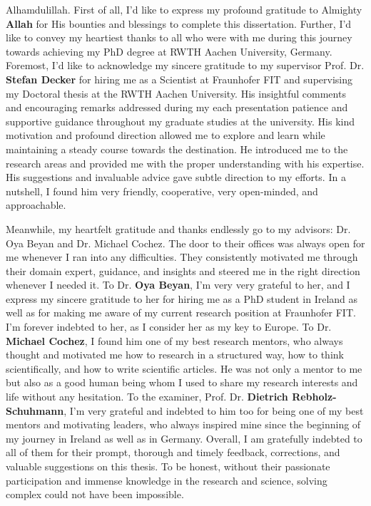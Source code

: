

\begin{acknowledgements}
    Alhamdulillah. First of all, I'd like to express my profound gratitude to Almighty \textbf{Allah} for His bounties and blessings to complete this dissertation. Further, I'd like to convey my heartiest thanks to all who were with me during this journey towards achieving my PhD degree at RWTH Aachen University, Germany. Foremost, I'd like to acknowledge my sincere gratitude to my supervisor Prof. Dr. \textbf{Stefan Decker} for hiring me as a Scientist at Fraunhofer FIT and supervising my Doctoral thesis at the RWTH Aachen University. His insightful comments and encouraging remarks addressed during my each presentation patience and supportive guidance throughout my graduate studies at the university. His kind motivation and profound direction allowed me to explore and learn while maintaining a steady course towards the destination. He introduced me to the research areas and provided me with the proper understanding with his expertise. His suggestions and invaluable advice gave subtle direction to my efforts. In a nutshell, I found him very friendly, cooperative, very open-minded, and approachable. 
    
    \hspace*{5mm} Meanwhile, my heartfelt gratitude and thanks endlessly go to my advisors: Dr. Oya Beyan and Dr. Michael Cochez. The door to their offices was always open for me whenever I ran into any difficulties. They consistently motivated me through their domain expert, guidance, and insights and steered me in the right direction whenever I needed it. To Dr. \textbf{Oya Beyan}, I'm very very grateful to her, and I express my sincere gratitude to her for hiring me as a PhD student in Ireland as well as for making me aware of my current research position at Fraunhofer FIT. I'm forever indebted to her, as I consider her as my key to Europe. To Dr. \textbf{Michael Cochez}, I found him one of my best research mentors, who always thought and motivated me how to research in a structured way, how to think scientifically, and how to write scientific articles. He was not only a mentor to me but also as a good human being whom I used to share my research interests and life without any hesitation. To the examiner, Prof. Dr. \textbf{Dietrich Rebholz-Schuhmann}, I'm very grateful and indebted to him too for being one of my best mentors and motivating leaders, who always inspired mine since the beginning of my journey in Ireland as well as in Germany. Overall, I am gratefully indebted to all of them for their prompt, thorough and timely feedback, corrections, and valuable suggestions on this thesis. To be honest, without their passionate participation and immense knowledge in the research and science, solving complex could not have been impossible.  
    

\end{acknowledgements}
